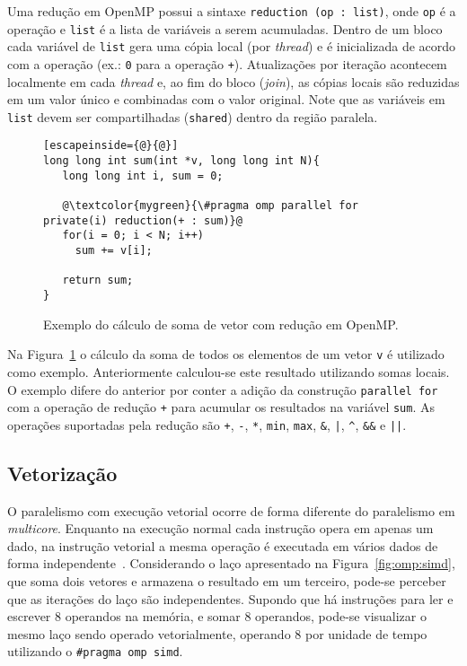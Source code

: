 Uma redução em OpenMP possui a sintaxe \verb+reduction (op : list)+, onde \texttt{op} é a operação e \texttt{list} é a lista de variáveis a serem acumuladas. Dentro de um bloco cada variável de \texttt{list} gera uma cópia local (por \textit{thread}) e é inicializada de acordo com a operação (ex.: \texttt{0} para a operação \texttt{+}). Atualizações por iteração acontecem localmente em cada \textit{thread} e, ao fim do bloco (\emph{join}), as cópias locais são reduzidas em um valor único e combinadas com o valor original. Note que as variáveis em \texttt{list} devem ser compartilhadas (\texttt{shared}) dentro da região paralela.

\begin{figure}[!htb]
\centering
\begin{lstlisting}[escapeinside={@}{@}]
long long int sum(int *v, long long int N){
   long long int i, sum = 0;

   @\textcolor{mygreen}{\#pragma omp parallel for private(i) reduction(+ : sum)}@
   for(i = 0; i < N; i++)
     sum += v[i];

   return sum;
}
\end{lstlisting}
\caption{Exemplo do cálculo de soma de vetor com redução em OpenMP.}
\label{fig:omp:reduction2}
\end{figure}

Na Figura~\ref{fig:omp:reduction2} o cálculo da soma de todos os elementos de um vetor \texttt{v} é utilizado como exemplo. Anteriormente calculou-se este resultado utilizando somas locais. O exemplo difere do anterior por conter a adição da construção \texttt{parallel for} com a operação de redução \texttt{+} para acumular os resultados na variável \verb+sum+. As operações suportadas pela redução são \texttt{+}, \texttt{-}, \texttt{*}, \texttt{min}, \texttt{max}, \verb+&+, \verb+|+, \verb+^+, \verb+&&+ e \verb+||+.

\subsection{Vetorização}

O paralelismo com execução vetorial ocorre de forma diferente do paralelismo em \textit{multicore}. Enquanto na execução normal cada instrução opera em apenas um dado, na instrução vetorial a mesma operação é executada em vários dados de forma independente~\cite{satish2012can}. Considerando o laço apresentado na Figura~\ref{fig:omp:simd}, que soma dois vetores e armazena o resultado em um terceiro, pode-se perceber que as iterações do laço são independentes. 
Supondo que há instruções para ler e escrever 8 operandos na memória, e somar 8 operandos, pode-se visualizar o mesmo laço sendo operado vetorialmente, operando 8 por unidade de tempo utilizando o \texttt{\#pragma omp simd}.

